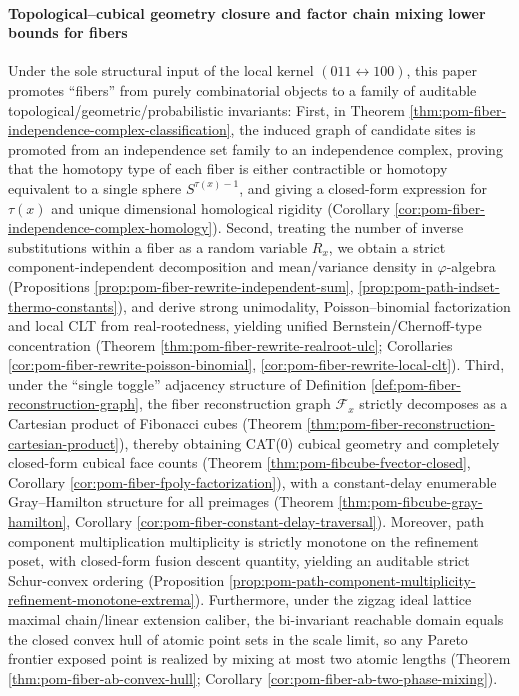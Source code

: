 \paragraph{Topological--cubical geometry closure and factor chain mixing lower bounds for fibers}
Under the sole structural input of the local kernel \((011\leftrightarrow 100)\), this paper promotes ``fibers'' from purely combinatorial objects to a family of auditable topological/geometric/probabilistic invariants:
First, in Theorem \ref{thm:pom-fiber-independence-complex-classification}, the induced graph of candidate sites is promoted from an independence set family to an independence complex,
proving that the homotopy type of each fiber is either contractible or homotopy equivalent to a single sphere \(S^{\tau(x)-1}\), and giving a closed-form expression for \(\tau(x)\) and unique dimensional homological rigidity (Corollary \ref{cor:pom-fiber-independence-complex-homology}).
Second, treating the number of inverse substitutions within a fiber as a random variable \(R_x\), we obtain a strict component-independent decomposition and mean/variance density in \(\varphi\)-algebra (Propositions \ref{prop:pom-fiber-rewrite-independent-sum}, \ref{prop:pom-path-indset-thermo-constants}), and derive strong unimodality, Poisson--binomial factorization and local CLT from real-rootedness, yielding unified Bernstein/Chernoff-type concentration (Theorem \ref{thm:pom-fiber-rewrite-realroot-ulc}; Corollaries \ref{cor:pom-fiber-rewrite-poisson-binomial}, \ref{cor:pom-fiber-rewrite-local-clt}).
Third, under the ``single toggle'' adjacency structure of Definition \ref{def:pom-fiber-reconstruction-graph}, the fiber reconstruction graph \(\mathcal F_x\) strictly decomposes as a Cartesian product of Fibonacci cubes (Theorem \ref{thm:pom-fiber-reconstruction-cartesian-product}), thereby obtaining CAT(0) cubical geometry and completely closed-form cubical face counts (Theorem \ref{thm:pom-fibcube-fvector-closed}, Corollary \ref{cor:pom-fiber-fpoly-factorization}), with a constant-delay enumerable Gray--Hamilton structure for all preimages (Theorem \ref{thm:pom-fibcube-gray-hamilton}, Corollary \ref{cor:pom-fiber-constant-delay-traversal}).
Moreover, path component multiplication multiplicity is strictly monotone on the refinement poset, with closed-form fusion descent quantity, yielding an auditable strict Schur-convex ordering (Proposition \ref{prop:pom-path-component-multiplicity-refinement-monotone-extrema}).
Furthermore, under the zigzag ideal lattice maximal chain/linear extension caliber, the bi-invariant reachable domain equals the closed convex hull of atomic point sets in the scale limit, so any Pareto frontier exposed point is realized by mixing at most two atomic lengths (Theorem \ref{thm:pom-fiber-ab-convex-hull}; Corollary \ref{cor:pom-fiber-ab-two-phase-mixing}).
